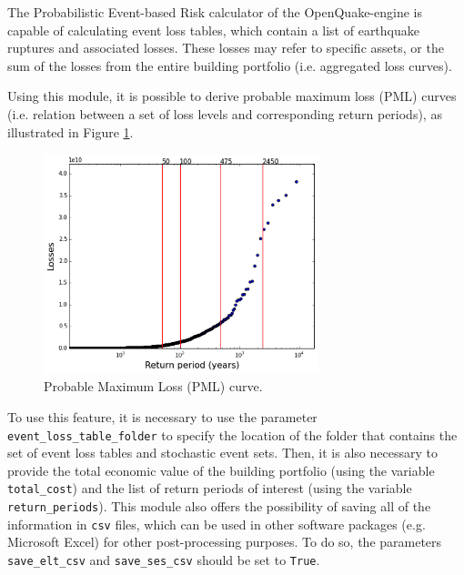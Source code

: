 The Probabilistic Event-based Risk calculator \citep{SilvaEtAl2014a} of the OpenQuake-engine is capable of calculating event loss tables, which contain a list of earthquake ruptures and associated losses. These losses may refer to specific assets, or the sum of the losses from the entire building portfolio (i.e. aggregated loss curves).

Using this module, it is possible to derive probable maximum loss (PML) curves (i.e. relation between a set of loss levels and corresponding return periods), as illustrated in Figure \ref{fig:pml}.

\begin{figure}[htb]
  \centering
      \includegraphics[width=8cm]{figures/pml_example.png}
  \caption{Probable Maximum Loss (PML) curve.}
  \label{fig:pml}
\end{figure}

To use this feature, it is necessary to use the parameter \verb=event_loss_table_folder= to specify the location of the folder that contains the set of event loss tables and stochastic event sets. Then, it is also necessary to provide the total economic value of the building portfolio (using the variable \verb=total_cost=) and the list of return periods of interest (using the variable \verb=return_periods=). This module also offers the possibility of saving all of the information in \verb=csv= files, which can be used in other software packages (e.g. Microsoft Excel) for other post-processing purposes. To do so, the parameters \verb=save_elt_csv= and \verb=save_ses_csv= should be set to \verb=True=.
